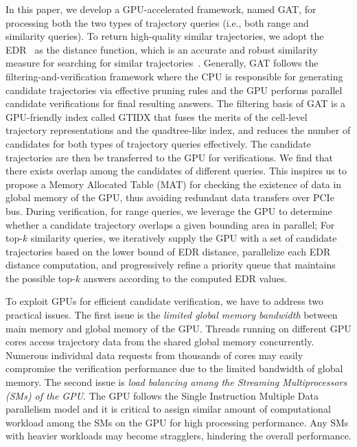 \documentclass[10pt,conference,letterpaper]{IEEEtran}
\newcommand{\frname}{GAT\xspace }
\newcommand{\idxname}{GTIDX\xspace }
\begin{document}
In this paper, we develop a GPU-accelerated framework, named \frname, for processing both the two types of trajectory queries (i.e., both range and similarity queries).
To return high-quality similar trajectories, we adopt the EDR~\cite{DBLP:conf/sigmod/ChenOO05} as the distance function, which is an accurate and robust similarity measure for searching for similar trajectories~\cite{EDWP15}.
Generally, \frname follows the filtering-and-verification framework where the CPU is responsible for generating candidate trajectories via effective pruning rules and the GPU performs parallel candidate verifications for final resulting answers.
The filtering basis of \frname is a GPU-friendly index called \idxname that fuses the merits of the cell-level trajectory representations and the quadtree-like index, and reduces the number of candidates for both types of trajectory queries effectively.
The candidate trajectories are then be transferred to the GPU for verifications. We find that there exists overlap among the candidates of different queries. This inspires us to propose a Memory Allocated Table (MAT) for checking the existence of data in global memory of the GPU, thus avoiding redundant data transfers over PCIe bus.
During verification, for range queries, we leverage the GPU to determine whether a candidate trajectory overlaps a given bounding area in parallel; For top-$k$ similarity queries, we iteratively supply the GPU with a set of candidate trajectories based on the lower bound of EDR distance, parallelize each EDR distance computation, and progressively refine a priority queue that maintains the possible top-$k$ answers according to the computed EDR values.

To exploit GPUs for efficient candidate verification, we have to address two practical issues.
The first issue is the \emph{limited global memory bandwidth} between main memory and global memory of the GPU.
Threads running on different GPU cores access trajectory data from the shared global memory concurrently. Numerous individual data requests from thousands of cores may easily compromise the verification performance due to the limited bandwidth of global memory.
The second issue is \emph{load balancing among the Streaming Multiprocessors (SMs) of the GPU}. The GPU follows the Single Instruction Multiple Data parallelism model and it is critical to assign similar amount of computational workload among the SMs on the GPU for high processing performance. Any SMs with heavier workloads may become stragglers, hindering the overall performance.
\end{document}
